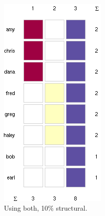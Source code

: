 \documentclass{report} %
\begin{document}
\begin{figure}
\centering
\begin{subfigure}{.4\textwidth}
  \centering
  \includegraphics[width=.7\linewidth]{toy2/ea/top20_0.1.png}
  \caption{Using both, 10\% structural.}
  \label{fig:sub3}
\end{subfigure}%
\begin{subfigure}{.6\textwidth}
  \centering

\end{subfigure}
\end{figure}
\end{document}
